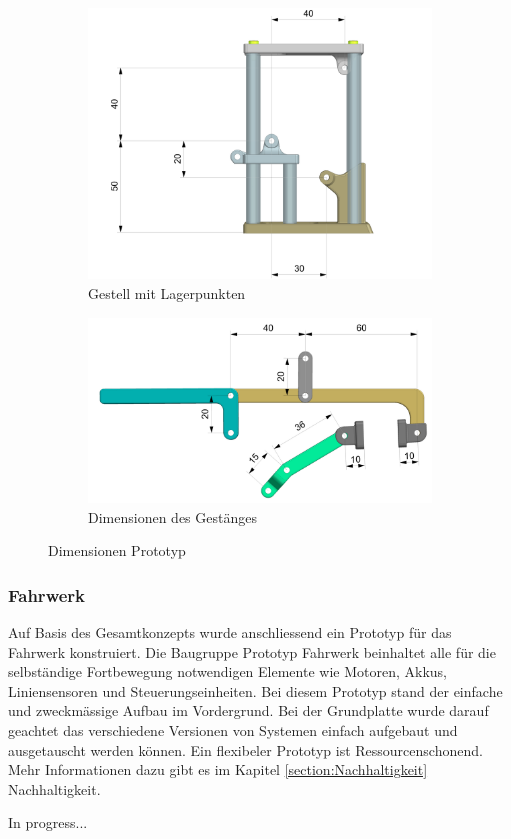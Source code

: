 \begin{figure}[H]
\begin{subfigure}{0.9\textwidth}
\includegraphics[width=\textwidth]{assets/greifer-prototyp/Greifer_Dimensionen_Lagerpunkte.png}
\caption{Gestell mit Lagerpunkten}
\label{fig:gripper-frame-mounting-points}
\end{subfigure}
\begin{subfigure}{0.9\textwidth}
\includegraphics[width=\textwidth]{assets/greifer-prototyp/Greifer_Dimensionen_Arme.png}
\caption{Dimensionen des Gestänges}
\label{fig:gripper-linkage-dimensions}
\end{subfigure}
\caption{Dimensionen Prototyp}
\label{gripper-prototype-dimensions}
\end{figure}

\subsubsection{Fahrwerk}

Auf Basis des Gesamtkonzepts wurde anschliessend ein Prototyp für das Fahrwerk konstruiert. Die Baugruppe Prototyp Fahrwerk beinhaltet alle für die selbständige Fortbewegung notwendigen Elemente wie Motoren, Akkus, Liniensensoren und Steuerungseinheiten.  Bei diesem Prototyp stand der einfache und zweckmässige Aufbau im Vordergrund. Bei der Grundplatte wurde darauf geachtet das verschiedene  Versionen von Systemen einfach aufgebaut und ausgetauscht werden können. Ein flexibeler Prototyp ist Ressourcenschonend. Mehr Informationen dazu gibt es im Kapitel \ref{section:Nachhaltigkeit} Nachhaltigkeit. 

In progress...
